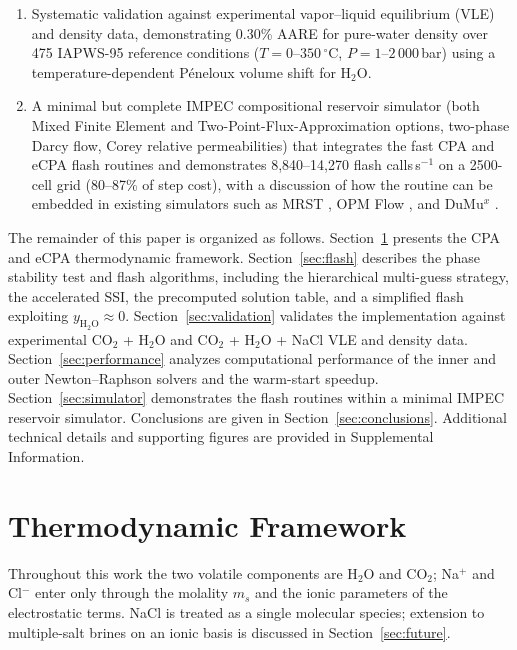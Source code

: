 \documentclass[preprint,12pt,number]{elsarticle}
\begin{document}
\begin{enumerate}
        tracing, and stability mapping; temperature and salinity continuation within the table
        build to maximize convergence rates; and a logarithmic pressure axis for the interpolation
        grid.
  \item Systematic validation against experimental vapor--liquid equilibrium (VLE) and density data,
        demonstrating 0.30\% AARE for pure-water density over 475 IAPWS-95 reference conditions
        ($T = 0$--$350\,^\circ$C, $P = 1$--$2\,000$\,bar) using a temperature-dependent
        Péneloux volume shift for H$_2$O.
  \item A minimal but complete IMPEC compositional reservoir simulator (both Mixed Finite Element and Two-Point-Flux-Approximation options,
        two-phase Darcy flow, Corey relative permeabilities) that integrates the fast
        CPA and eCPA flash routines and demonstrates 8{,}840--14{,}270 flash calls\,s$^{-1}$ on a 2500-cell
        grid (80--87\% of step cost), with a discussion of how the routine can be embedded
        in existing simulators such as MRST \citep{Lie2019}, OPM Flow \citep{Rasmussen2021}, and DuMu$^x$ \citep{Koch2021}.
\end{enumerate}

The remainder of this paper is organized as follows.
Section~\ref{sec:eos} presents the CPA and eCPA thermodynamic framework.
Section~\ref{sec:flash} describes the phase stability test and flash algorithms,
including the hierarchical multi-guess strategy, the accelerated SSI, the
precomputed solution table, and a simplified flash exploiting $y_{\text{H}_2\text{O}} \approx 0$.
Section~\ref{sec:validation} validates the implementation against experimental
CO$_2$ + H$_2$O and CO$_2$ + H$_2$O + NaCl VLE and density data.
Section~\ref{sec:performance} analyzes computational performance of the inner and
outer Newton--Raphson solvers and the warm-start speedup.
Section~\ref{sec:simulator} demonstrates the flash routines within a minimal
IMPEC reservoir simulator.
Conclusions are given in Section~\ref{sec:conclusions}.
Additional technical details and supporting figures are provided in Supplemental Information. 

\section{Thermodynamic Framework}
\label{sec:eos}

Throughout this work the two volatile components are H$_2$O and CO$_2$;
Na$^+$ and Cl$^-$ enter only through the molality $m_s$ and the ionic parameters
of the electrostatic terms.
NaCl is treated as a single molecular species; extension to multiple-salt brines
on an ionic basis is discussed in Section~\ref{sec:future}.
\end{document}
